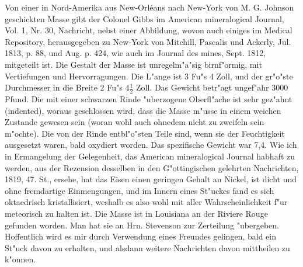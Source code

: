 \documentclass[a4paper, 11pt, oneside, polutonikogreek, german]{article}
\begin{document}
Von einer in Nord-Amerika aus New-Orléans nach New-York von M. G. Johnson geschickten Masse gibt der Colonel Gibbs im American mineralogical Journal, Vol. 1, Nr. 30, Nachricht, nebst einer Abbildung, wovon auch einiges im Medical Repository, herausgegeben zu New-York von Mitchill, Pascalis und Ackerly, Jul. 1813, p. 88, und Aug. p. 424, wie auch im Journal des mines, Sept. 1812, mitgeteilt ist. Die Gestalt der Masse ist unregelm"a"sig birnf"ormig, mit Vertiefungen und Hervorragungen. Die L"ange ist 3 Fu"s 4 Zoll, und der gr"o"ste Durchmesser in die Breite 2 Fu"s $\mathfrak{4\frac{1}{2}}$ Zoll. Das Gewicht betr"agt ungef"ahr 3000 Pfund. Die mit einer schwarzen Rinde "uberzogene Oberfl"ache ist sehr gez"ahnt (indented), woraus geschlossen wird, dass die Masse m"usse in einem weichen Zustande gewesen sein (woran wohl auch ohnedem nicht zu zweifeln sein m"ochte). Die von der Rinde entbl"o"sten Teile sind, wenn sie der Feuchtigkeit ausgesetzt waren, bald oxydiert worden. Das spezifische Gewicht war 7,4. Wie ich in Ermangelung der Gelegenheit, das American mineralogical Journal habhaft zu werden, aus der Rezension desselben in den G"ottingischen gelehrten Nachrichten, 1819, 47. St., ersehe, hat das Eisen einen geringen Gehalt an Nickel, ist dicht und ohne fremdartige Einmengungen, und im Innern eines St"uckes fand es sich oktaedrisch kristallisiert, weshalb es also wohl mit aller Wahrscheinlichkeit f"ur meteorisch zu halten ist. Die Masse ist in Louisiana an der Riviere Rouge gefunden worden. Man hat sie an Hrn. Stevenson zur Zerteilung "ubergeben. Hoffentlich wird es mir durch Verwendung eines Freundes gelingen, bald ein St"uck davon zu erhalten, und alsdann weitere Nachrichten davon mittheilen zu k"onnen.
\end{document}
